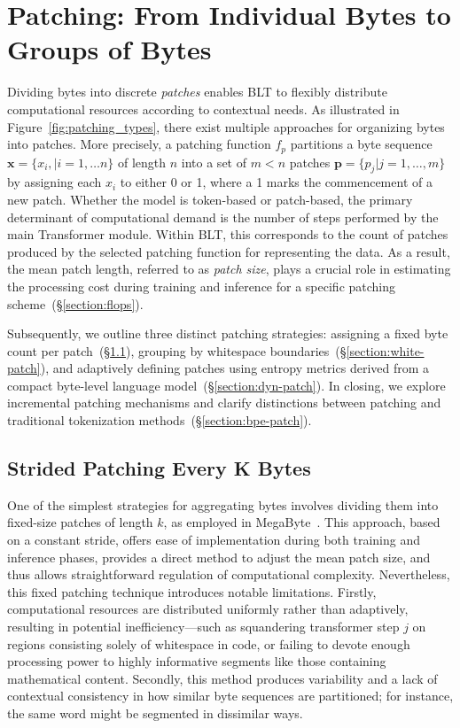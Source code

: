 \section{Patching: From Individual Bytes to Groups of Bytes}
\label{section:patching}

Dividing bytes into discrete \textit{patches} enables {\textsc BLT} to flexibly distribute computational resources according to contextual needs. As illustrated in Figure~\ref{fig:patching_types}, there exist multiple approaches for organizing bytes into patches. More precisely, a patching function $f_p$ partitions a byte sequence $\pmb{x}=\{x_i,|i=1,\ldots n\}$ of length $n$ into a set of $m < n$ patches $\pmb{p}=\{p_j|j=1,\ldots,m\}$ by assigning each $x_i$ to either 0 or 1, where a 1 marks the commencement of a new patch. Whether the model is token-based or patch-based, the primary determinant of computational demand is the number of steps performed by the main Transformer module. Within {\textsc BLT}, this corresponds to the count of patches produced by the selected patching function for representing the data. As a result, the mean patch length, referred to as \textit{patch size}, plays a crucial role in estimating the processing cost during training and inference for a specific patching scheme~(\S\ref{section:flops}).

Subsequently, we outline three distinct patching strategies: assigning a fixed byte count per patch~(\S\ref{section:static-patch}), grouping by whitespace boundaries~(\S\ref{section:white-patch}), and adaptively defining patches using entropy metrics derived from a compact byte-level language model~(\S\ref{section:dyn-patch}). In closing, we explore incremental patching mechanisms and clarify distinctions between patching and traditional tokenization methods~(\S\ref{section:bpe-patch}).

\subsection{Strided Patching Every K Bytes}
\label{section:static-patch}

One of the simplest strategies for aggregating bytes involves dividing them into fixed-size patches of length $k$, as employed in MegaByte~\citep{yu2023megabyte}. This approach, based on a constant stride, offers ease of implementation during both training and inference phases, provides a direct method to adjust the mean patch size, and thus allows straightforward regulation of computational complexity. Nevertheless, this fixed patching technique introduces notable limitations. Firstly, computational resources are distributed uniformly rather than adaptively, resulting in potential inefficiency—such as squandering transformer step $j$ on regions consisting solely of whitespace in code, or failing to devote enough processing power to highly informative segments like those containing mathematical content. Secondly, this method produces variability and a lack of contextual consistency in how similar byte sequences are partitioned; for instance, the same word might be segmented in dissimilar ways.

